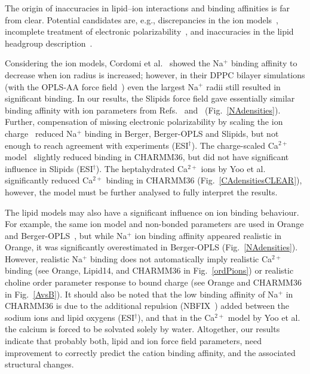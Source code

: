 \documentclass[twoside,twocolumn,9pt]{article}
\begin{document}
The origin of inaccuracies in lipid--ion interactions and binding affinities is far from clear.
Potential candidates are, e.g., discrepancies in the ion models~\cite{hess06,chen07,Reif13},
incomplete treatment of electronic polarizability~\cite{leontyev11}, and inaccuracies in the lipid headgroup 
description~\cite{botan15}.

Considering the ion models, Cordomi et al.~\cite{cordomi09} showed the Na$^+$ binding affinity to decrease when ion radius is increased;
however, in their DPPC bilayer simulations (with the OPLS-AA force field~\cite{jorgensen96}) even the largest Na$^+$ radii still resulted in significant binding.
In our results, the Slipids force field gave essentially similar binding affinity with 
ion parameters from Refs.~ and~ (Fig.~\ref{NAdensities}). Further, compensation of missing electronic 
polarizability by scaling the ion charge~\cite{kohagen16,leontyev11} reduced Na$^+$ binding in Berger, 
Berger-OPLS and Slipids, but not enough to reach agreement with experiments (ESI$^\dag$). 
The charge-scaled Ca$^{2+}$ model~\cite{kohagen14} slightly reduced binding in CHARMM36, but did not have 
significant influence in Slipids (ESI$^\dag$).
The heptahydrated Ca$^{2+}$ ions by Yoo et al.~\cite{yoo16} significantly reduced Ca$^{2+}$ binding in CHARMM36 (Fig.~\ref{CAdensitiesCLEAR}), however, the
model must be further analysed to fully interpret the results.

The lipid models may also have a significant influence on ion binding behaviour.
For example, the same ion model and non-bonded parameters are used in Orange and Berger-OPLS~\cite{tieleman06},
but while Na$^+$ ion binding affinity appeared realistic in Orange, it was significantly overestimated 
in Berger-OPLS (Fig.~\ref{NAdensities}). However, realistic Na$^+$ binding does not automatically imply
realistic Ca$^{2+}$ binding (see Orange, Lipid14, and CHARMM36 in Fig.~\ref{ordPions}) or realistic choline
order parameter response to bound charge (see Orange and CHARMM36 in Fig.~\ref{AvsB}).
It should also be noted that the low binding affinity of Na$^+$ in CHARMM36 is due to 
the additional repulsion (NBFIX~\cite{venable13}) added between the sodium ions and lipid oxygens (ESI$^\dag$),
and that in the Ca$^{2+}$ model by Yoo et al.~\cite{yoo16} the calcium is forced to be solvated solely by water.
Altogether, our results indicate that probably both, lipid and ion force field parameters, need improvement to 
correctly predict the cation binding affinity, and the associated structural changes.
\end{document}
